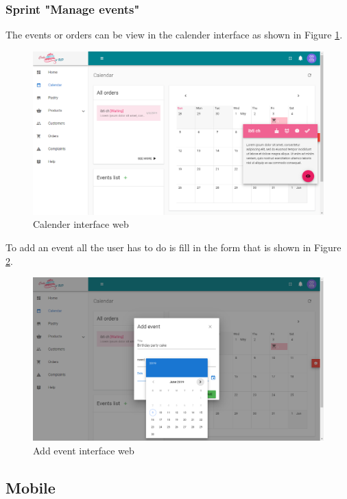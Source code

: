 \documentclass[12pt,a4paper]{report}
\begin{document}
\subsubsection*{Sprint "Manage events"}
The events or orders can be view in the calender interface as shown in Figure \ref{listevents-interface}.
\begin{figure}[H]
	\centering
	\includegraphics[width=5.6in,keepaspectratio]{listevents.png}
	\caption{Calender interface web}
	\label{listevents-interface}
\end{figure}
To add an event all the user has to do is fill in the form that is shown in Figure \ref{addevent-interface}.
\begin{figure}[H]
	\vspace*{1in}
	\centering
	\includegraphics[width=7in,keepaspectratio]{addevent.png}
	\caption{Add event interface web}
	\label{addevent-interface}
\end{figure}
\clearpage
\subsection{Mobile}
\end{document}
